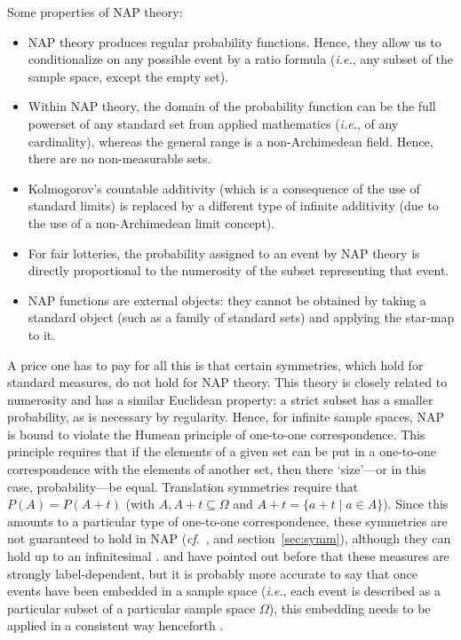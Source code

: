 Some properties of NAP theory:
\begin{itemize}
  \item NAP theory produces regular probability functions. Hence, they allow us to conditionalize on any possible event by a ratio formula (\textit{i.e.}, any subset of the sample space, except the empty set).
  \item Within NAP theory, the domain of the probability function can be the full powerset of any standard set from applied mathematics (\textit{i.e.}, of any cardinality), whereas the general range is a non-Archimedean field. Hence, there are no non-measurable sets.
  \item Kolmogorov's countable additivity (which is a consequence of the use of standard limits) is replaced by a different type of infinite additivity (due to the use of a non-Archimedean limit concept).
  \item For fair lotteries, the probability assigned to an event by NAP theory is directly proportional to the numerosity of the subset representing that event.
  \item NAP functions are external objects: they cannot be obtained by taking a standard object (such as a family of standard sets) and applying the star-map to it.
\end{itemize}

A price one has to pay for all this is that certain symmetries, which hold for standard measures, do not hold for NAP theory. This theory is closely related to numerosity and has a similar Euclidean property: a strict subset has a smaller probability, as is necessary by regularity. Hence, for infinite sample spaces, NAP is bound to violate the Humean principle of one-to-one correspondence. This principle requires that if the elements of a given set can be put in a one-to-one
correspondence with the elements of another set, then there `size'---or in this case, probability---be equal. Translation symmetries require that $P(A)=P(A+t)$ (with $A, A+t \subseteq \Omega$ and $A+t=\{a+t \mid a\in A\}$). Since this amounts to a particular type of one-to-one correspondence, these symmetries are not guaranteed to hold in NAP (\textit{cf}.\ \citet{Williamson:2007,Parker:2013}, and section~\ref{sec:symm}), although they can hold up to an infinitesimal \citep{BernsteinWattenberg:1969}. \citet{Bartha:2004} and \citet{Weintraub:2008} have pointed out before that these measures are strongly label-dependent, but it is probably more accurate to say that once events have been embedded in a sample space (\textit{i.e.}, each event is described as a particular subset of a particular sample space $\Omega$), this embedding needs to be applied in a consistent way henceforth \citep{Hofweber:2014,Benci_etal:2018}.

